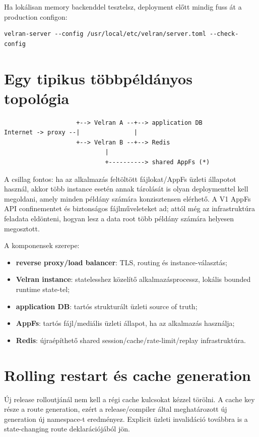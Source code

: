 Ha lokálisan memory backenddel tesztelsz, deployment előtt mindig fuss át a production configon:

\begin{lstlisting}
velran-server --config /usr/local/etc/velran/server.toml --check-config
\end{lstlisting}

\section{Egy tipikus többpéldányos topológia}

\begin{lstlisting}
                    +--> Velran A --+--> application DB
Internet -> proxy --|               |
                    +--> Velran B --+--> Redis
                            |
                            +----------> shared AppFs (*)
\end{lstlisting}

A csillag fontos: ha az alkalmazás feltöltött fájlokat/AppFs üzleti állapotot használ, akkor több instance esetén annak tárolását is olyan deploymenttel kell megoldani, amely minden példány számára konzisztensen elérhető. A V1 AppFs API confinementet és biztonságos fájlműveleteket ad; attól még az infrastruktúra feladata eldönteni, hogyan lesz a data root több példány számára helyesen megosztott.

A komponensek szerepe:

\begin{itemize}
  \item \textbf{reverse proxy/load balancer}: TLS, routing és instance-választás;
  \item \textbf{Velran instance}: statelesshez közelítő alkalmazásprocessz, lokális bounded runtime state-tel;
  \item \textbf{application DB}: tartós strukturált üzleti source of truth;
  \item \textbf{AppFs}: tartós fájl/mediális üzleti állapot, ha az alkalmazás használja;
  \item \textbf{Redis}: újraépíthető shared session/cache/rate-limit/replay infrastruktúra.
\end{itemize}

\section{Rolling restart és cache generation}

Új release rolloutjánál nem kell a régi cache kulcsokat kézzel törölni. A cache key része a route generation, ezért a release/compiler által meghatározott új generation új namespace-t eredményez. Explicit üzleti invalidáció továbbra is a state-changing route deklarációjából jön.

